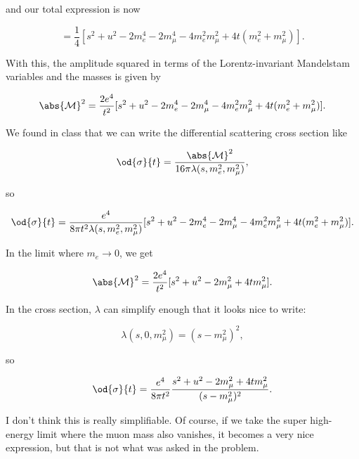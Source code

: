 and our total expression is now

\begin{equation*}
    = \frac{1}{4}[s^2 + u^2 - 2m_e^4 - 2m_{\mu}^4 - 4m_e^2m_{\mu}^2 + 4t(m_e^2 + m_{\mu}^2)].
\end{equation*}

With this, the amplitude squared in terms of the Lorentz-invariant Mandelstam variables and the masses is given by

\begin{equation}
    \abs{\mathcal{M}}^2 = \frac{2e^4}{t^2}[s^2 + u^2 - 2m_e^4 - 2m_{\mu}^4 - 4m_e^2m_{\mu}^2 + 4t(m_e^2 + m_{\mu}^2)].
\end{equation}

We found in class that we can write the differential scattering cross section like

\begin{equation*}
    \od{\sigma}{t} = \frac{\abs{\mathcal{M}}^2}{16\pi \lambda(s, m_e^2, m_{\mu}^2)},
\end{equation*}

so

\begin{equation*}
    \od{\sigma}{t} = \frac{e^4}{8\pi t^2 \lambda(s, m_e^2, m_{\mu}^2)} [s^2 + u^2 - 2m_e^4 - 2m_{\mu}^4 - 4m_e^2m_{\mu}^2 + 4t(m_e^2 + m_{\mu}^2)].
\end{equation*}

In the limit where $m_e \rightarrow 0$, we get

\begin{equation}
    \abs{\mathcal{M}}^2 = \frac{2e^4}{t^2}[s^2 + u^2 - 2m_{\mu}^2 + 4tm_{\mu}^2].
\end{equation}

In the cross section, $\lambda$ can simplify enough that it looks nice to write:

\begin{equation*}
    \lambda(s, 0, m_{\mu}^2) = (s - m_{\mu}^2)^2,
\end{equation*}

so

\begin{equation}
    \od{\sigma}{t} = \frac{e^4}{8\pi t^2} \frac{s^2 + u^2 - 2m_{\mu}^2 + 4tm_{\mu}^2}{(s - m_{\mu}^2)^2}.
\end{equation}

I don't think this is really simplifiable. Of course, if we take the super high-energy limit where the muon mass also vanishes, it becomes a very nice expression, but that is not what was asked in the problem.